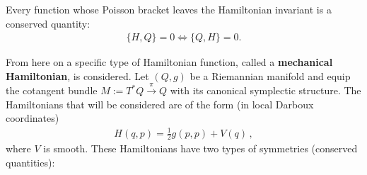     \begin{property}
        Every function whose Poisson bracket leaves the Hamiltonian invariant is a conserved quantity:
        \begin{gather}
            \{H,Q\} = 0\iff\{Q,H\} = 0.
        \end{gather}
    \end{property}

    From here on a specific type of Hamiltonian function, called a \textbf{mechanical Hamiltonian}, is considered. Let $(Q,g)$ be a Riemannian manifold and equip the cotangent bundle $M:=T^*Q\overset{\pi}{\rightarrow}Q$ with its canonical symplectic structure. The Hamiltonians that will be considered are of the form (in local Darboux coordinates)
    \begin{gather}
        H(q,p) = \frac{1}{2}g(p,p) + V(q)\,,
    \end{gather}
    where $V$ is smooth. These Hamiltonians have two types of symmetries (conserved quantities):


